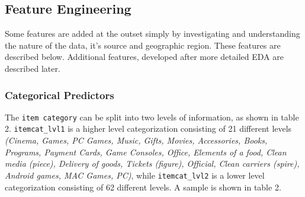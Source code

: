 \documentclass[floatsintext,man]{apa6}
\theoremstyle{definition}
\theoremstyle{definition}
\theoremstyle{definition}
\theoremstyle{remark}
\begin{document}
\begin{table}[H]

\caption{\label{tab:unnamed-chunk-1}Sample Items}
\centering
{}
\end{table}

\subsection{Feature Engineering}\label{feature-engineering}

Some features are added at the outset simply by investigating and
understanding the nature of the data, it's source and geographic region.
These features are described below. Additional features, developed after
more detailed EDA are described later.

\subsubsection{Categorical Predictors}\label{categorical-predictors}

The \texttt{item\ category} can be split into two levels of information,
as shown in table 2. \texttt{itemcat\_lvl1} is a higher level
categorization consisting of 21 different levels \emph{(Cinema, Games,
PC Games, Music, Gifts, Movies, Accessories, Books, Programs, Payment
Cards, Game Consoles, Office, Elements of a food, Clean media (piece),
Delivery of goods, Tickets (figure), Official, Clean carriers (spire),
Android games, MAC Games, PC)}, while \texttt{itemcat\_lvl2} is a lower
level categorization consisting of 62 different levels. A sample is
shown in table 2.
\end{document}
